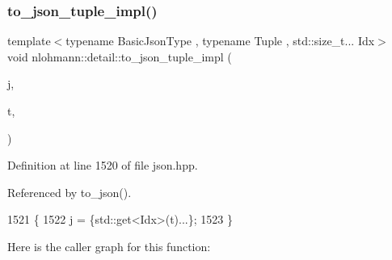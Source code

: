 \subsubsection{\texorpdfstring{to\+\_\+json\+\_\+tuple\+\_\+impl()}{to\_json\_tuple\_impl()}}
{\footnotesize\ttfamily template$<$typename Basic\+Json\+Type , typename Tuple , std\+::size\+\_\+t... Idx$>$ \\
void nlohmann\+::detail\+::to\+\_\+json\+\_\+tuple\+\_\+impl (\begin{DoxyParamCaption}\item[{Basic\+Json\+Type \&}]{j,  }\item[{const Tuple \&}]{t,  }\item[{\hyperlink{structnlohmann_1_1detail_1_1index__sequence}{index\+\_\+sequence}$<$ Idx... $>$}]{ }\end{DoxyParamCaption})}



Definition at line 1520 of file json.\+hpp.



Referenced by to\+\_\+json().


\begin{DoxyCode}
1521 \{
1522     j = \{std::get<Idx>(t)...\};
1523 \}
\end{DoxyCode}
Here is the caller graph for this function\+:
